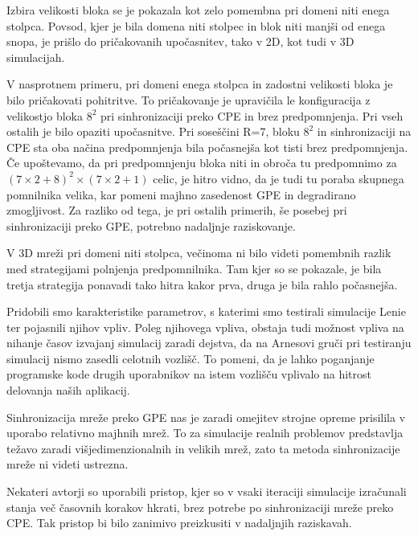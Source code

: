 \documentclass[a4paper, 12pt, openright]{book}
\begin{document}
Izbira velikosti bloka se je pokazala kot zelo pomembna pri domeni niti enega stolpca.
Povsod, kjer je bila domena niti stolpec in blok niti manjši od enega snopa, je prišlo do pričakovanih upočasnitev, tako v 2D, kot tudi v 3D simulacijah.

V nasprotnem primeru, pri domeni enega stolpca in zadostni velikosti bloka je bilo pričakovati pohitritve.
To pričakovanje je upravičila le konfiguracija z velikostjo bloka \(8^2\) pri sinhronizaciji preko CPE in brez predpomnjenja.
Pri vseh ostalih je bilo opaziti upočasnitve.
Pri soseščini R=7, bloku \(8^2\) in sinhronizaciji na CPE sta oba načina predpomnjenja bila počasnejša kot tisti brez predpomnjenja.
Če upoštevamo, da pri predpomnjenju bloka niti in obroča tu predpomnimo za \((7 \times 2 + 8)^2 \times (7 \times 2 + 1)\) celic, je hitro vidno, da je tudi tu poraba skupnega pomnilnika velika, kar pomeni majhno zasedenost GPE in degradirano zmogljivost.
Za razliko od tega, je pri ostalih primerih, še posebej pri sinhronizaciji preko GPE, potrebno nadaljnje raziskovanje.

V 3D mreži pri domeni niti stolpca, večinoma ni bilo videti pomembnih razlik med strategijami polnjenja predpomnilnika.
Tam kjer so se pokazale, je bila tretja strategija ponavadi tako hitra kakor prva, druga je bila rahlo počasnejša.

Pridobili smo karakteristike parametrov, s katerimi smo testirali simulacije Lenie ter pojasnili njihov vpliv.
Poleg njihovega vpliva, obstaja tudi možnost vpliva na nihanje časov izvajanj simulacij zaradi dejstva, da na Arnesovi gruči pri testiranju simulacij nismo zasedli celotnih vozlišč.
To pomeni, da je lahko poganjanje programske kode drugih uporabnikov na istem vozlišču vplivalo na hitrost delovanja naših aplikacij.

Sinhronizacija mreže preko GPE nas je zaradi omejitev strojne opreme prisilila v uporabo relativno majhnih mrež.
To za simulacije realnih problemov predstavlja težavo zaradi višjedimenzionalnih in velikih mrež, zato ta metoda sinhronizacije mreže ni videti ustrezna.

Nekateri avtorji \cite{holewinski2012high, SCHAFER20112027} so uporabili pristop, kjer so v vsaki iteraciji simulacije izračunali stanja več časovnih korakov hkrati, brez potrebe po sinhronizaciji mreže preko CPE.
Tak pristop bi bilo zanimivo preizkusiti v nadaljnjih raziskavah.

\end{document}
